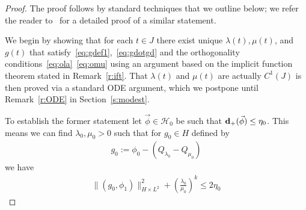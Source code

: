 \documentclass[10pt,reqno]{amsart}
\newcommand{\red}[1]{\textcolor{red}{#1}}
\newcommand{\HH}{\mathcal{H}}
\newcommand{\la}{\lambda}
\newcommand{\s}{\sigma}
\newcommand{\ti}{\widetilde}
\newcommand{\EQ}[1]{\begin{equation}\begin{split} #1 \end{split}\end{equation}}
\numberwithin{equation}{section}
\theoremstyle{remark}
\newcommand{\0}{\emptyset}
\newcommand{\bfd}{{\bf d}}
\begin{document}
\begin{proof}%
The proof %
follows by standard techniques that we outline below; we refer the reader to~\cite[Lemma 3.3]{JJ15}  for a detailed proof of a similar statement. 

 We begin by showing that for each $t\in J$ there exist unique $\la(t), \mu(t)$, and $g(t)$ that satisfy~\eqref{eq:gdef1},~\eqref{eq:gdotgd} and the orthogonality conditions~\eqref{eq:ola}~\eqref{eq:omu} using an argument based on the implicit function theorem stated in Remark~\ref{r:ift}. That $\la(t)$ and $\mu(t)$ are actually $C^1(J)$ is then proved via a standard ODE argument, which we postpone until Remark~\ref{r:ODE} in Section~\ref{s:modest}. 
 
 To establish the former statement let $\vec \phi \in \HH_0$ be such that $\bfd_+(\vec \phi) \le \eta_0$. This means we can find $\la_0, \mu_0>0$ such that for $g_0 \in H$ defined by 
\EQ{ \label{eq:g0def1} 
g_0 := \phi_0 - (Q_{\la_0}  - Q_{\mu_0})
}
we have 
\EQ{
\| (g_0, \phi_1) \|_{H\times L^2}^2 + \left( \frac{\la_0}{\mu_0} \right)^k  \le 2 \eta_0
}


\end{proof}
\end{document}
